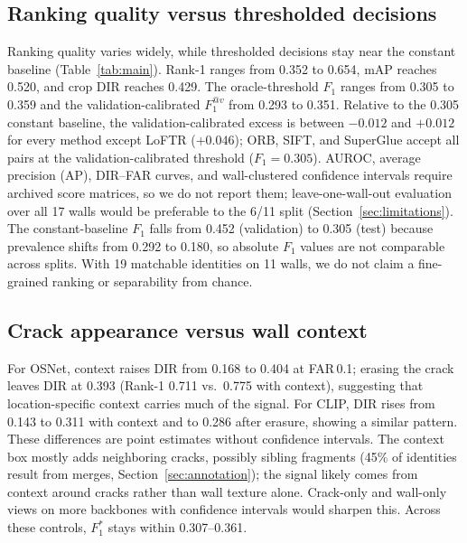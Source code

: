 \subsection{Ranking quality versus thresholded decisions}
\label{sec:baselines}

Ranking quality varies widely, while thresholded decisions stay near the constant baseline (Table~\ref{tab:main}).
Rank-1 ranges from 0.352 to 0.654, mAP reaches 0.520, and crop DIR reaches 0.429.
The oracle-threshold $F_1$ ranges from 0.305 to 0.359 and the validation-calibrated $F_1^{@v}$ from 0.293 to 0.351. Relative to the 0.305 constant baseline, the validation-calibrated excess is between $-0.012$ and $+0.012$ for every method except LoFTR ($+0.046$); ORB, SIFT, and SuperGlue accept all pairs at the validation-calibrated threshold ($F_1 = 0.305$).
AUROC, average precision (AP), DIR--FAR curves, and wall-clustered confidence intervals require archived score matrices, so we do not report them; leave-one-wall-out evaluation over all 17 walls would be preferable to the 6/11 split (Section~\ref{sec:limitations}).
The constant-baseline $F_1$ falls from 0.452 (validation) to 0.305 (test) because prevalence shifts from 0.292 to 0.180, so absolute $F_1$ values are not comparable across splits.
With 19 matchable identities on 11 walls, we do not claim a fine-grained ranking or separability from chance.

\subsection{Crack appearance versus wall context}
\label{sec:controls}

For OSNet, context raises DIR from 0.168 to 0.404 at FAR\,0.1; erasing the crack leaves DIR at 0.393 (Rank-1 0.711 vs.\ 0.775 with context), suggesting that location-specific context carries much of the signal.
For CLIP, DIR rises from 0.143 to 0.311 with context and to 0.286 after erasure, showing a similar pattern.
These differences are point estimates without confidence intervals.
The context box mostly adds neighboring cracks, possibly sibling fragments (45\% of identities result from merges, Section~\ref{sec:annotation}); the signal likely comes from context around cracks rather than wall texture alone.
Crack-only and wall-only views on more backbones with confidence intervals would sharpen this.
Across these controls, $F_{1}^{*}$ stays within 0.307--0.361.

